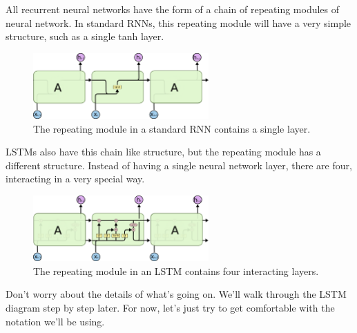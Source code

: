 {All recurrent neural networks have the form of a chain of repeating modules of neural network. In standard RNNs, this repeating module will have a very simple structure, such as a single tanh layer.
\renewcommand{\figurename}{Abb.}
\begin{figure}[htp]
\centering
\includegraphics[width=0.60\textwidth]{pictures/LSTM3-SimpleRNN.png}
\caption[Repeating module of standard RNN]{The repeating module in a standard RNN contains a single layer.\protect\footnotemark}
\end{figure}
LSTMs also have this chain like structure, but the repeating module has a different structure. Instead of having a single neural network layer, there are four, interacting in a very special way.
\renewcommand{\figurename}{Abb.}
\begin{figure}[htp]
\centering
\includegraphics[width=0.60\textwidth]{pictures/LSTM3-chain.png}
\caption[Repeating module of LSTM]{The repeating module in an LSTM contains four interacting layers.\protect\footnotemark}
\end{figure}
Don’t worry about the details of what’s going on. We’ll walk through the LSTM diagram step by step later. For now, let’s just try to get comfortable with the notation we’ll be using.
\renewcommand{\figurename}{Abb.}
\begin{figure}[htp]

\end{figure}}
